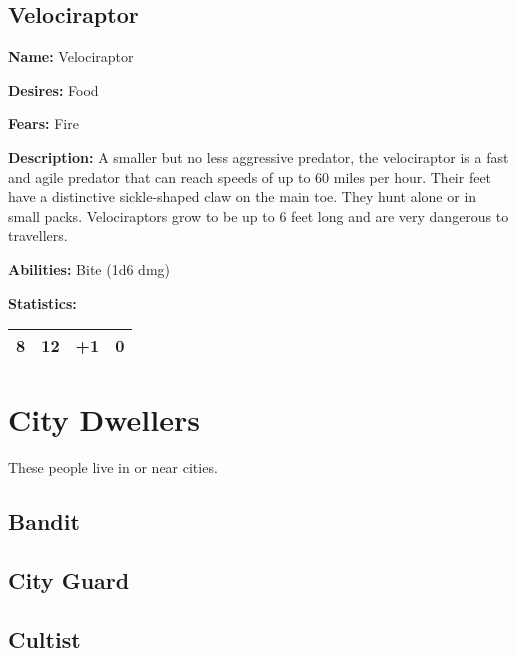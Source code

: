 \begin{multicols}{2}
\subsection{Velociraptor}

\textbf{Name:} Velociraptor

\textbf{Desires:} Food

\textbf{Fears:} Fire

\textbf{Description:} A smaller but no less aggressive predator, the velociraptor
is a fast and agile predator that can reach speeds of up to 60 miles per hour. Their
feet have a distinctive sickle-shaped claw on the main toe. They hunt alone or in small packs.
Velociraptors grow to be up to 6 feet long and are very dangerous to travellers.

\textbf{Abilities:} Bite (1d6 dmg)

\textbf{Statistics:}

\begin{center}
{
\begin{xtabular}{|l|l|l|l|}
8 & 12 & +1 & 0 \\
\hline
\end{xtabular}
}
\end{center}

\section{City Dwellers}

These people live in or near cities.

\subsection{Bandit}

\subsection{City Guard}

\subsection{Cultist}


\end{multicols}
